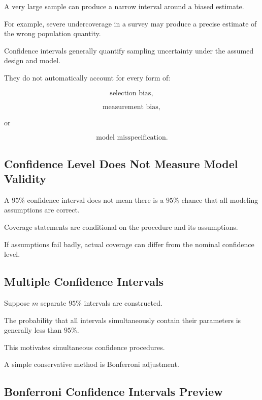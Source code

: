 A very large sample can produce a narrow interval around a biased
estimate.

For example, severe undercoverage in a survey may produce a precise
estimate of the wrong population quantity.

Confidence intervals generally quantify sampling uncertainty under the
assumed design and model.

They do not automatically account for every form of:

\[
\boxed{
\text{selection bias},
}
\]

\[
\boxed{
\text{measurement bias},
}
\]

or

\[
\boxed{
\text{model misspecification}.
}
\]

\subsection{Confidence Level Does Not Measure Model Validity}
\label{subsec:confidence-not-model-validity}

A \(95\%\) confidence interval does not mean there is a \(95\%\) chance
that all modeling assumptions are correct.

Coverage statements are conditional on the procedure and its
assumptions.

If assumptions fail badly, actual coverage can differ from the nominal
confidence level.

\subsection{Multiple Confidence Intervals}
\label{subsec:multiple-confidence-intervals-preview}

Suppose \(m\) separate \(95\%\) intervals are constructed.

The probability that all intervals simultaneously contain their
parameters is generally less than \(95\%\).

This motivates simultaneous confidence procedures.

A simple conservative method is Bonferroni adjustment.

\subsection{Bonferroni Confidence Intervals Preview}
\label{subsec:bonferroni-ci-preview}

